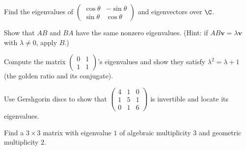 \begin{exercise}
Find the eigenvalues of $\begin{pmatrix}\cos\theta&-\sin\theta\\\sin\theta&\cos\theta\end{pmatrix}$ and eigenvectors over $\C$.
\end{exercise}

\begin{exercise}
Show that $AB$ and $BA$ have the same nonzero eigenvalues. (Hint: if $AB\mathbf{v}=\lambda\mathbf{v}$ with $\lambda\ne0$, apply $B$.)
\end{exercise}

\begin{exercise}
Compute the matrix $\begin{pmatrix}0&1\\1&1\end{pmatrix}$'s eigenvalues and show they satisfy $\lambda^2=\lambda+1$ (the golden ratio and its conjugate).
\end{exercise}

\begin{exercise}
Use Gershgorin discs to show that $\begin{pmatrix}4&1&0\\1&5&1\\0&1&6\end{pmatrix}$ is invertible and locate its eigenvalues.
\end{exercise}

\begin{exercise}
Find a $3\times 3$ matrix with eigenvalue $1$ of algebraic multiplicity $3$ and geometric multiplicity $2$.
\end{exercise}
